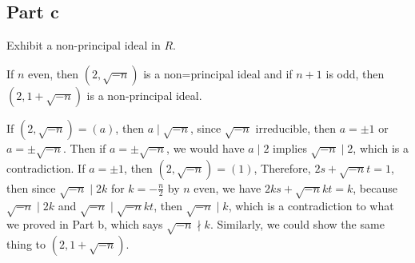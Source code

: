 \subsection{Part c}

\begin{question}
    Exhibit a non-principal ideal in $R$.
\end{question}

\begin{answer}
    If $n$ even, then $(2, \sqrt{-n})$ is a non=principal ideal and if $n+1$ is odd, then $(2,1+\sqrt{-n})$ is a non-principal ideal.
    
    If $(2,\sqrt{-n}) = (a)$, then $a \mid \sqrt{-n}$, since $\sqrt{-n}$ irreducible, then $a = \pm 1$ or $a = \pm \sqrt{-n}$. Then if $a = \pm \sqrt{-n}$, we would have $a \mid 2$ implies $\sqrt{-n} \mid 2$, which is a contradiction. If $a = \pm 1$, then $(2,\sqrt{-n}) = (1)$, Therefore, $2s + \sqrt{-n}t = 1$, then since $\sqrt{-n} \mid 2k$ for $k = -\tfrac{n}{2}$ by $n$ even, we have $2ks + \sqrt{-n}kt = k$, because $\sqrt{-n} \mid 2k$ and $\sqrt{-n}\mid \sqrt{-n}kt$, then $\sqrt{-n} \mid k$, which is a contradiction to what we proved in Part b, which says $\sqrt{-n} \nmid k$. Similarly, we could show the same thing to $(2,1+\sqrt{-n})$.
\end{answer}
